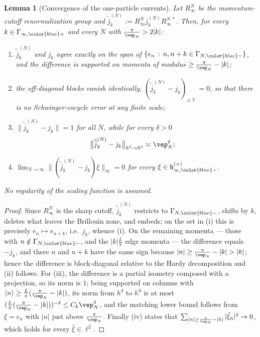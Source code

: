 \documentclass[a4paper, 11pt]{article}
\newcommand{\fh}{\mathfrak{h}}
\newcommand{\ltwo}{\ell^{2}}
\DeclareMathOperator{\1}{\mathds{1}}
\newtheorem{lemma}[thm]{Lemma}
\begin{document}
\begin{lemma}[Convergence of the one-particle currents]
\label{lem:U1cur1pconv}
Let $R^{N}_{\infty}$ be the momentum-cutoff renormalization group and $\tilde{\overline{j}}^{(N)}_{k}:=R^{N}_{\infty}\overline{j}^{(N)}_{k}R^{N\!\ *}_{\infty}$. Then, for every $k\in\Gamma_{\infty,{\color{blue}+}}$ and every $N$ with $\tfrac{\pi}{\vep_{N}}>2|k|$:
\begin{enumerate}
\item[(i)] $\tilde{\overline{j}}^{(N)}_{k}$ and $j_{k}$ \emph{agree exactly} on the span of $\{e_{n}\!\ :\!\ n,n+k\in\Gamma_{N,{\color{blue}-}}\}$, and the difference is supported on momenta of modulus $\geq\tfrac{\pi}{\vep_{N}}-|k|$;
\item[(ii)] the off-diagonal blocks vanish identically, $(\tilde{\overline{j}}^{(N)}_{k}-j_{k})_{\pm\mp} = 0$, so that there is no Schwinger-cocycle error at any finite scale;
\item[(iii)] $\|\tilde{\overline{j}}^{(N)}_{k}-j_{k}\| = 1$ for all $N$, while for every $\delta>0$
\begin{align}
\label{eq:U1curate}
\big\|\tilde{\overline{j}}^{(N)}_{k}-j_{k}\big\|_{h^{\delta}\rightarrow h^{0}} & \asymp \vep_{N}^{\delta};
\end{align}
\item[(iv)] $\lim_{N\rightarrow\infty}\|(\tilde{\overline{j}}^{(N)}_{k}-j_{k})\xi\|_{\infty} = 0$ for \emph{every} $\xi\in\fh^{(+)}_{\infty,{\color{blue}-}}$.
\end{enumerate}
No regularity of the scaling function is assumed.
\end{lemma}
\begin{proof}
Since $R^{N}_{\infty}$ is the sharp cutoff, $\tilde{\overline{j}}^{(N)}_{k}$ restricts to $\Gamma_{N,{\color{blue}-}}$, shifts by $k$, deletes what leaves the Brillouin zone, and embeds; on the set in (i) this is precisely $e_{n}\mapsto e_{n+k}$, i.e.~$j_{k}$, whence (i). On the remaining momenta --- those with $n\notin\Gamma_{N,{\color{blue}-}}$, and the $|k|\tfrac{L}{\pi}$ edge momenta --- the difference equals $-j_{k}$, and there $n$ and $n+k$ have the same sign because $|n|\geq\tfrac{\pi}{\vep_{N}}-|k|>|k|$; hence the difference is block-diagonal relative to the Hardy decomposition and (ii) follows. For (iii), the difference is a partial isometry composed with a projection, so its norm is $1$; being supported on columns with $\langle n\rangle\geq\tfrac{L}{\pi}(\tfrac{\pi}{\vep_{N}}-|k|)$, its norm from $h^{\delta}$ to $h^{0}$ is at most $(\tfrac{L}{\pi}(\tfrac{\pi}{\vep_{N}}-|k|))^{-\delta}\leq C_{k}\vep_{N}^{\delta}$, and the matching lower bound follows from $\xi=e_{n}$ with $|n|$ just above $\tfrac{\pi}{\vep_{N}}$. Finally (iv) states that $\sum_{|n|\geq\frac{\pi}{\vep_{N}}-|k|}|\hat{\xi}_{n}|^{2}\rightarrow0$, which holds for every $\hat{\xi}\in\ltwo$.
\end{proof}
\end{document}
